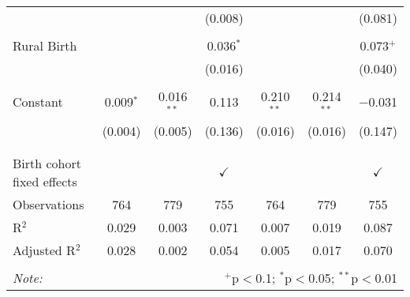 \begin{table}[!htbp]
\begin{tabular}{@{\extracolsep{5pt}}lcccccc}
  &  &  & (0.008) &  &  & (0.081) \\ 
  & & & & & & \\ 
 Rural Birth &  &  & 0.036$^{*}$ &  &  & 0.073$^{+}$ \\ 
  &  &  & (0.016) &  &  & (0.040) \\ 
  & & & & & & \\ 
 Constant & 0.009$^{*}$ & 0.016$^{**}$ & 0.113 & 0.210$^{**}$ & 0.214$^{**}$ & $-$0.031 \\ 
  & (0.004) & (0.005) & (0.136) & (0.016) & (0.016) & (0.147) \\ 
  & & & & & & \\ 
\hline \\[-1.8ex] 
Birth cohort fixed effects &  &  & $\checkmark$ &  &  & $\checkmark$ \\ 
Observations & 764 & 779 & 755 & 764 & 779 & 755 \\ 
R$^{2}$ & 0.029 & 0.003 & 0.071 & 0.007 & 0.019 & 0.087 \\ 
Adjusted R$^{2}$ & 0.028 & 0.002 & 0.054 & 0.005 & 0.017 & 0.070 \\ 
\hline 
\hline \\[-1.8ex] 
\textit{Note:}  & \multicolumn{6}{r}{$^{+}$p$<$0.1; $^{*}$p$<$0.05; $^{**}$p$<$0.01}} \\ 
\end{tabular} 
\end{table} 
